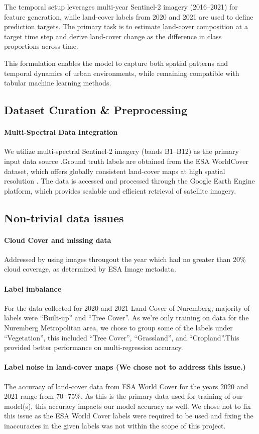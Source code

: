 \documentclass[11pt]{article}
\begin{document}
The temporal setup leverages multi-year Sentinel-2 imagery (2016–2021) for feature generation, while land-cover labels from 2020 and 2021 are used to define prediction targets. The primary task is to estimate land-cover composition at a target time step and derive land-cover change as the difference in class proportions across time.

This formulation enables the model to capture both spatial patterns and temporal dynamics of urban environments, while remaining compatible with tabular machine learning methods.

\subsection{Dataset Curation \& Preprocessing}
\paragraph{Multi-Spectral Data Integration}
We utilize multi-spectral Sentinel-2 imagery \citep{Sentinel2} (bands B1–B12) as the primary input data source \citep{drusch2012sentinel}.Ground truth labels are obtained from the ESA WorldCover dataset, which offers globally consistent land-cover maps at high spatial resolution \citep{zanaga2021worldcover}. 
 The data is accessed and processed through the Google Earth Engine \citep{GEE} platform, which provides scalable and efficient retrieval of satellite imagery. 

\subsection*{Non-trivial data issues}
\paragraph{Cloud Cover and missing data} Addressed by using images througout the year which had no greater than 20\% cloud coverage, as determined by ESA Image metadata.
\paragraph{Label imbalance}For the data collected for 2020 and 2021 Land Cover of Nuremberg, majority of labels were “Built-up” and “Tree Cover”. As we’re only training on data for the Nuremberg Metropolitan area, we chose to group some of the labels under “Vegetation”, this included “Tree Cover”, “Grassland”, and “Cropland”.This provided better performance on multi-regression accuracy.
\paragraph{Label noise in land-cover maps (We chose not to address this issue.)} The accuracy of land-cover data from ESA World Cover for the years 2020 and 2021 range from 70 -75\%. As this is the primary data used for training of our model(s), this accuracy impacts our model accuracy as well. We chose not to fix this issue as the ESA World Cover labels were required to be used and fixing the inaccuracies in the given labels was not within the scope of this project.
\end{document}
